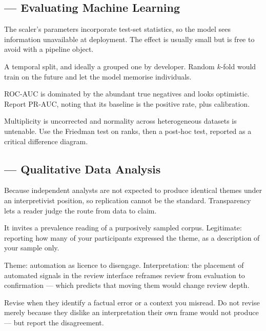 \subsection*{ --- Evaluating Machine Learning}
\begin{tightnum}
  \item The scaler's parameters incorporate test-set statistics, so the model
    sees information unavailable at deployment. The effect is usually small but
    is free to avoid with a pipeline object.
  \item A temporal split, and ideally a grouped one by developer. Random
    $k$-fold would train on the future and let the model memorise individuals.
  \item ROC-AUC is dominated by the abundant true negatives and looks optimistic.
    Report PR-AUC, noting that its baseline is the positive rate, plus
    calibration.
  \item Multiplicity is uncorrected and normality across heterogeneous datasets
    is untenable. Use the Friedman test on ranks, then a post-hoc test, reported
    as a critical difference diagram.
\end{tightnum}

\subsection*{ --- Qualitative Data Analysis}
\begin{tightnum}
  \item Because independent analysts are not expected to produce identical
    themes under an interpretivist position, so replication cannot be the
    standard. Transparency lets a reader judge the route from data to claim.
  \item It invites a prevalence reading of a purposively sampled corpus.
    Legitimate: reporting how many of your participants expressed the theme, as
    a description of your sample only.
  \item Theme: automation as licence to disengage. Interpretation: the
    placement of automated signals in the review interface reframes review from
    evaluation to confirmation --- which predicts that moving them would change
    review depth.
  \item Revise when they identify a factual error or a context you misread. Do
    not revise merely because they dislike an interpretation their own frame
    would not produce --- but report the disagreement.
\end{tightnum}

